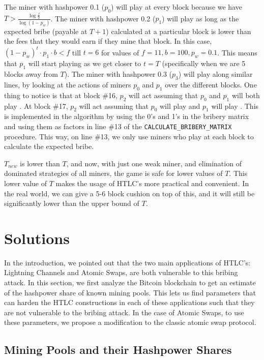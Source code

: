 The miner with hashpower 0.1 ($p_0$) will play  at every block because we have $T > \frac{\log \frac{f}{b}}{\log (1-p_w)}$. The miner with hashpower 0.2 ($p_1$) will play  as long as the expected bribe (payable at $T+1$) calculated at a particular block is lower than the fees that they would earn if they mine that block. In this case, $(1- p_w)^t \cdot p_1 \cdot b < f$ till $t = 6$ for values of $f = 11, b = 100, p_w = 0.1$. This means that $p_1$ will start playing \follow{} as we get closer to $t = T$ (specifically when we are 5 blocks away from $T$). The miner with hashpower 0.3 ($p_3$) will play  along similar lines, by looking at the actions of miners $p_0$ and $p_1$ over the different blocks. One thing to notice is that at block \#16, $p_2$ will act assuming that $p_0$ and $p_1$ will both play . At block \#17, $p_2$ will act assuming that $p_0$ will play  and $p_1$ will play \follow{}. This is implemented in the algorithm by using the 0's and 1's in the bribery matrix and using them as factors in line \#13 of the \texttt{CALCULATE\_BRIBERY\_MATRIX} procedure. This way, on line \#13, we only use miners who play  at each block to calculate the expected bribe.

$T_{new}$ is lower than $T$, and now, with just one weak miner, and elimination of dominated strategies of all miners, the game is safe for lower values of $T$. This lower value of $T$ makes the usage of HTLC's more practical and convenient. In the real world, we can give a 5-6 block cushion on top of this, and it will still be significantly lower than the upper bound of $T$.

\section{Solutions}
\label{section:solutions}
In the introduction, we pointed out that the two main applications of HTLC's: Lightning Channels and Atomic Swaps, are both vulnerable to this bribing attack. In this section, we first analyze the Bitcoin blockchain to get an estimate of the hashpower share of known mining pools. This lets us find parameters that can harden the HTLC constructions in each of these applications such that they are not vulnerable to the bribing attack. In the case of Atomic Swaps, to use these parameters, we propose a modification to the classic atomic swap protocol.

\subsection{Mining Pools and their Hashpower Shares}\label{section:mining_pools}

